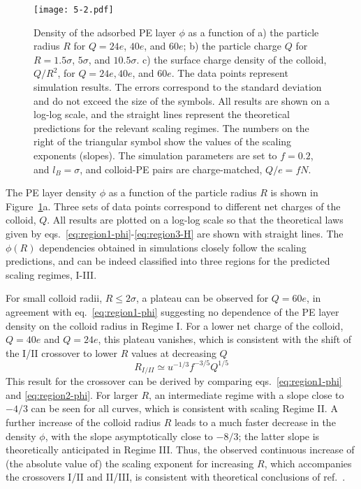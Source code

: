 \documentclass[journal=mamobx, manuscript=article]{achemso}
\begin{document}
\begin{figure}[ht]
\centering
\texttt{[image: 5-2.pdf]}
\caption{Density of the adsorbed PE layer $\phi$ as a function of 
a) the particle radius $R$ for $Q = 24e$, $40e$, and $60e$;
b) the particle charge $Q$ for $R = 1.5 \sigma$, $5 \sigma$, and $10.5 \sigma$.
c) the surface charge density of the colloid, $Q / R^2$, for $Q = 24e, 40e$, and $60e$.
The data points represent simulation results. The errors correspond to the standard deviation and do not exceed the size of the symbols. All results are shown on a log-log scale, and the straight lines represent the theoretical predictions for the relevant scaling regimes. The numbers on the right of the triangular symbol show the values of the scaling exponents (slopes). The simulation parameters are set to $f = 0.2$, and $l_{B} = \sigma$, and colloid-PE pairs are charge-matched, $Q/e=fN$. }
\label{fig:phi}
\end{figure}

The PE layer density $\phi$ as a function of the particle radius $R$ is shown in Figure~\ref{fig:phi}a. Three sets of data points correspond to different net charges of the colloid, $Q$. All results are plotted on a log-log scale so that the theoretical laws given by eqs.~\ref{eq:region1-phi}-\ref{eq:region3-H} are shown with straight lines. The $\phi(R)$ dependencies obtained in simulations closely follow the scaling predictions, and can be indeed classified into three regions for the predicted scaling regimes, I-III. 

For small colloid radii, $R \leq 2 \sigma$, a plateau can be observed for $Q = 60e$, in agreement with eq.~\ref{eq:region1-phi} suggesting no dependence of the PE layer density on the colloid radius in Regime I. For a lower net charge of the colloid, $Q = 40e$ and $Q = 24e$, this plateau vanishes, which is consistent with the shift of the I/II crossover to lower $R$ values at decreasing $Q$~\cite{artem2022hybrid} 
\begin{equation}
R_{I/II} \simeq u^{-1/3} f^{-3/5} Q^{1/5}
\label{crossover-I/II}
\end{equation}
This result for the crossover can be derived by comparing eqs.~\ref{eq:region1-phi} and \ref{eq:region2-phi}. For larger $R$, an intermediate regime with a slope close to $-4/3$ can be seen for all curves, which is consistent with scaling Regime II. A further increase of the colloid radius $R$ leads to a much faster decrease in the density $\phi$, with the slope asymptotically close to $-8/3$; the latter slope is theoretically anticipated in Regime III. Thus, the observed continuous increase of (the absolute value of) the scaling exponent for increasing $R$, which accompanies the crossovers I/II and II/III, is consistent with theoretical conclusions of ref.~.
\end{document}
